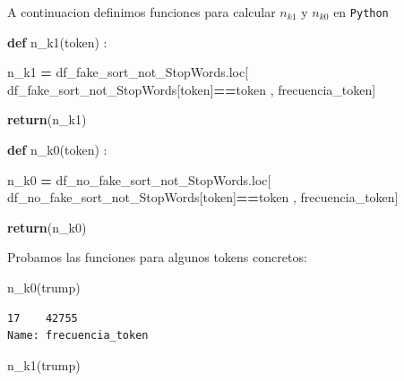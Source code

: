 \documentclass[
  11pt,
  a4paper,
]{article}
\newenvironment{Shaded}{\begin{snugshade}}{\end{snugshade}}
\newcommand{\ControlFlowTok}[1]{\textcolor[rgb]{0.13,0.29,0.53}{\textbf{#1}}}
\newcommand{\KeywordTok}[1]{\textcolor[rgb]{0.13,0.29,0.53}{\textbf{#1}}}
\newcommand{\NormalTok}[1]{#1}
\newcommand{\OperatorTok}[1]{\textcolor[rgb]{0.81,0.36,0.00}{\textbf{#1}}}
\newcommand{\StringTok}[1]{\textcolor[rgb]{0.31,0.60,0.02}{#1}}
\begin{document}
A continuacion definimos funciones para calcular \(n_{k1}\) y \(n_{k0}\)
en \texttt{Python}

\begin{Shaded}
\begin{Highlighting}[]
\KeywordTok{def}\NormalTok{ n\_k1(token) : }

\NormalTok{    n\_k1 }\OperatorTok{=}\NormalTok{ df\_fake\_sort\_not\_StopWords.loc[ df\_fake\_sort\_not\_StopWords[}\StringTok{\textquotesingle{}token\textquotesingle{}}\NormalTok{]}\OperatorTok{==}\NormalTok{token , }\StringTok{\textquotesingle{}frecuencia\_token\textquotesingle{}}\NormalTok{]}

    \ControlFlowTok{return}\NormalTok{(n\_k1)}
\end{Highlighting}
\end{Shaded}

\begin{Shaded}
\begin{Highlighting}[]
\KeywordTok{def}\NormalTok{ n\_k0(token) : }

\NormalTok{    n\_k0 }\OperatorTok{=}\NormalTok{ df\_no\_fake\_sort\_not\_StopWords.loc[ df\_no\_fake\_sort\_not\_StopWords[}\StringTok{\textquotesingle{}token\textquotesingle{}}\NormalTok{]}\OperatorTok{==}\NormalTok{token , }\StringTok{\textquotesingle{}frecuencia\_token\textquotesingle{}}\NormalTok{]}

    \ControlFlowTok{return}\NormalTok{(n\_k0)}
\end{Highlighting}
\end{Shaded}

Probamos las funciones para algunos tokens concretos:

\begin{Shaded}
\begin{Highlighting}[]
\NormalTok{n\_k0(}\StringTok{\textquotesingle{}trump\textquotesingle{}}\NormalTok{) }
\end{Highlighting}
\end{Shaded}

\begin{verbatim}
17    42755
Name: frecuencia_token 
\end{verbatim}

\begin{Shaded}
\begin{Highlighting}[]
\NormalTok{n\_k1(}\StringTok{\textquotesingle{}trump\textquotesingle{}}\NormalTok{) }
\end{Highlighting}
\end{Shaded}
\end{document}
